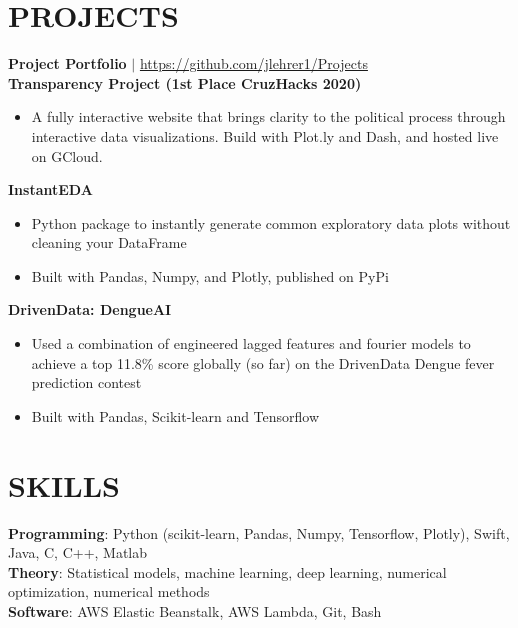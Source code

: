 \documentclass[margin]{res}
\begin{document}
\begin{resume}
\section{PROJECTS}
    \textbf{Project Portfolio} $\mid$ \textcolor{blue}{\href{https://github.com/jlehrer1/Projects}{https://github.com/jlehrer1/Projects}} \vspace {2mm} \\
    \textbf{Transparency Project (1st Place CruzHacks 2020)}
    \begin{itemize}
        \item A fully interactive website that brings clarity to the political process through interactive data visualizations. Build with Plot.ly and Dash, and hosted live on GCloud.
    \end{itemize}\vspace*{-8pt}
    \textbf{InstantEDA}
    \begin{itemize}
        \item Python package to instantly generate common exploratory data plots without cleaning your DataFrame
        \item Built with Pandas, Numpy, and Plotly, published on PyPi
    \end{itemize}\vspace*{-8pt}
    \textbf{DrivenData: DengueAI}
    \begin{itemize}
        \item Used a combination of engineered lagged features and fourier models to achieve a top 11.8\% score globally (so far) on the DrivenData Dengue fever prediction contest
        \item Built with Pandas, Scikit-learn and Tensorflow
    \end{itemize}\vspace*{-8pt}
\section{SKILLS}
    \textbf{Programming}: Python (scikit-learn, Pandas, Numpy, Tensorflow, Plotly), Swift, Java, C, C++, Matlab\\
    \textbf{Theory}: Statistical models, machine learning, deep learning, numerical optimization, numerical methods \\
    \textbf{Software}: AWS Elastic Beanstalk, AWS Lambda, Git, Bash 

\end{resume}
\end{document}

